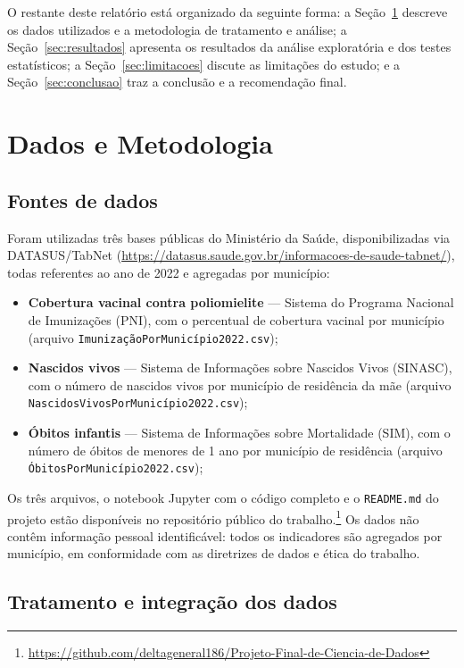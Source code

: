 \documentclass[pdflatex,sn-mathphys-num]{sn-jnl}
\begin{document}
O restante deste relatório está organizado da seguinte forma: a Seção~\ref{sec:dados} descreve os dados utilizados e a metodologia de tratamento e análise; a Seção~\ref{sec:resultados} apresenta os resultados da análise exploratória e dos testes estatísticos; a Seção~\ref{sec:limitacoes} discute as limitações do estudo; e a Seção~\ref{sec:conclusao} traz a conclusão e a recomendação final.

\section{Dados e Metodologia}\label{sec:dados}

\subsection{Fontes de dados}

Foram utilizadas três bases públicas do Ministério da Saúde, disponibilizadas via DATASUS/TabNet (\url{https://datasus.saude.gov.br/informacoes-de-saude-tabnet/}), todas referentes ao ano de 2022 e agregadas por município:

\begin{itemize}
\item \textbf{Cobertura vacinal contra poliomielite} — Sistema do Programa Nacional de Imunizações (PNI), com o percentual de cobertura vacinal por município (arquivo \texttt{ImunizaçãoPorMunicípio2022.csv});
\item \textbf{Nascidos vivos} — Sistema de Informações sobre Nascidos Vivos (SINASC), com o número de nascidos vivos por município de residência da mãe (arquivo \texttt{NascidosVivosPorMunicípio2022.csv});
\item \textbf{Óbitos infantis} — Sistema de Informações sobre Mortalidade (SIM), com o número de óbitos de menores de 1 ano por município de residência (arquivo \texttt{ÓbitosPorMunicípio2022.csv});
\end{itemize}

Os três arquivos, o notebook Jupyter com o código completo e o \texttt{README.md} do projeto estão disponíveis no repositório público do trabalho.\footnote{\url{https://github.com/deltageneral186/Projeto-Final-de-Ciencia-de-Dados}} Os dados não contêm informação pessoal identificável: todos os indicadores são agregados por município, em conformidade com as diretrizes de dados e ética do trabalho.

\subsection{Tratamento e integração dos dados}
\end{document}

